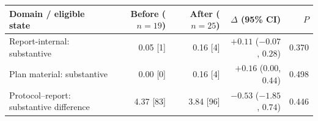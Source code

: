 \begin{tabularx}{\linewidth}{@{}Yrrrr@{}}
\toprule
Domain / eligible state & Before ($n=19$) & After ($n=25$) & $\Delta$ (95\% CI) & $P$ \\
\midrule
Report-internal: substantive & 0.05 [1] & 0.16 [4] & $+0.11$ ($-0.07$, $0.28$) & 0.370 \\
Plan material: substantive & 0.00 [0] & 0.16 [4] & $+0.16$ ($0.00$, $0.44$) & 0.498 \\
Protocol--report: substantive difference & 4.37 [83] & 3.84 [96] & $-0.53$ ($-1.85$, $0.74$) & 0.446 \\
\bottomrule
\end{tabularx}
